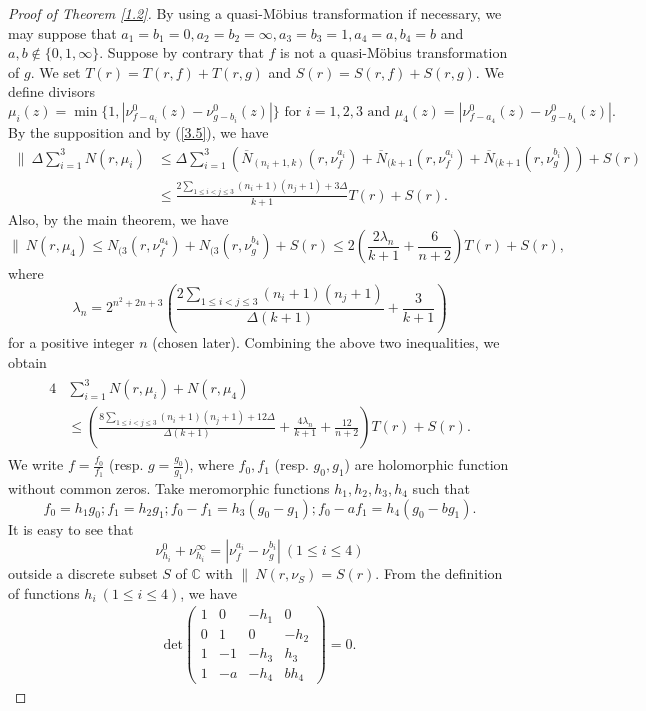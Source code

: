 \documentclass[10pt,a4paper]{amsart}
\newcommand{\C}{{\mathbb{C}}}
\begin{document}
\begin{proof}[Proof of Theorem \ref{1.2}]
By using a quasi-M\"{o}bius transformation if necessary, we may suppose that $a_1=b_1=0,a_2=b_2=\infty,a_3=b_3=1,a_4=a,b_4=b$ and $a,b\not\in\{0,1,\infty\}$. Suppose by contrary that $f$ is not a quasi-M\"{o}bius transformation of $g$. We set $T(r)=T(r,f)+T(r,g)$ and $S(r)=S(r,f)+S(r,g).$ 
We define divisors 
$$\mu_i(z)=\min\{1,|\nu^0_{f-a_i}(z)-\nu^0_{g-b_i}(z)|\}\text{ for }i=1,2,3\text{ and }\mu_4(z)=|\nu^0_{f-a_4}(z)-\nu^0_{g-b_4}(z)|.$$
By the supposition and by (\ref{3.5}), we have
\begin{align*}
\|\ \Delta\sum_{i=1}^3N(r,\mu_i)&\le\Delta\sum_{i=1}^3\left(\overline N_{(n_i+1,k)}(r,\nu^{a_i}_f)+\overline N_{(k+1}(r,\nu^{a_i}_f)+\overline N_{(k+1}(r,\nu^{b_i}_g)\right)+S(r)\\
&\le \frac{2\sum_{1\le i<j\le 3}(n_i+1)(n_j+1)+3\Delta}{k+1}T(r)+S(r).
\end{align*}
Also, by the main theorem, we have
$$\|\ N(r,\mu_4)\le N_{(3}(r,\nu^{a_4}_f)+N_{(3}(r,\nu^{b_4}_g)+S(r)\le 2\left(\frac{2\lambda_n}{k+1}+\frac{6}{n+2}\right)T(r)+S(r),$$
where
$$\lambda_n=2^{n^2+2n+3}\left(\frac{2\sum_{1\le i<j\le 3}(n_i+1)(n_j+1)}{\Delta(k+1)}+\frac{3}{k+1}\right)$$
for a positive integer $n$ (chosen later). Combining the above two inequalities, we obtain
\begin{align}\label{4.2}
\begin{split}
4&\sum_{i=1}^3N(r,\mu_i)+N(r,\mu_4)\\
&\le \left(\frac{8\sum_{1\le i<j\le 3}(n_i+1)(n_j+1)+12\Delta}{\Delta(k+1)}+\frac{4\lambda_n}{k+1}+\frac{12}{n+2}\right)T(r)+S(r).
\end{split}
\end{align}
We write $f=\frac{f_0}{f_1}$ (resp. $g=\frac{g_0}{g_1}$), where $f_0,f_1$ (resp. $g_0,g_1$) are holomorphic function without common zeros. Take meromorphic functions $h_1,h_2,h_3,h_4$ such that
$$f_0=h_1 g_0;f_1=h_2 g_1;f_0-f_1=h_3(g_0-g_1);f_0-af_1=h_4(g_0-bg_1).$$
It is easy to see that 
$$\nu^0_{h_i}+\nu^\infty_{h_i}=|\nu^{a_i}_f-\nu^{b_i}_g|\ (1\le i\le 4)$$
outside a discrete subset $S$ of $\C$ with $\|\ N(r,\nu_S)=S(r)$.
From the definition of functions $h_i\ (1\le i\le 4)$, we have 
\begin{align*}
\mathrm{det}\left (
\begin{array}{cccc}
1&0&-h_1&0\\ 
0&1&0&-h_2\\
1&-1&-h_3&h_3\\
1&-a&-h_4&bh_4
\end{array}\right )=0.

\end{align*}
\end{proof}
\end{document}

